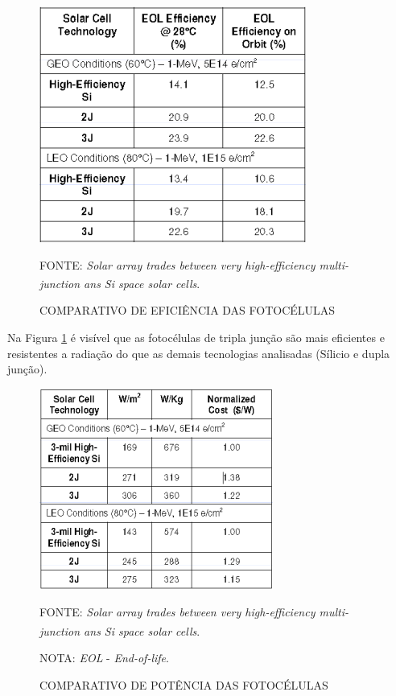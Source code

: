 \documentclass[
	12pt,				%
	openright,			%
	oneside,			%
	a4paper,			%
	english,			%
	french,				%
	spanish,			%
	brazil,				%
	oldfontcommands
	]{abntex2}
\begin{document}
	\begin{figure}[th]
		\caption{COMPARATIVO DE EFICIÊNCIA DAS FOTOCÉLULAS}
		\label{Fig_cell_comp1}
		\centering
		\includegraphics[width=0.6\linewidth]{./figs/cell_comp1}
			
		\begin{small}
			FONTE: \textit{Solar array trades between very high-efficiency multi-junction ans Si space solar cells}.\textsuperscript{\cite{Fatemi}}
		\end{small}
		
		
	\end{figure}
	
	Na Figura \ref{Fig_cell_comp1} é visível que as fotocélulas de tripla junção são mais eficientes e resistentes a radiação do que as demais tecnologias analisadas (Sílicio e dupla junção).
	
	\begin{figure}[th]
		\caption{COMPARATIVO DE POTÊNCIA DAS FOTOCÉLULAS}
		\label{Fig_cell_comp2}
		\centering
		\includegraphics[width=0.6\linewidth]{./figs/cell_comp2}
			
		\begin{small}
			FONTE: \textit{Solar array trades between very high-efficiency multi-junction ans Si space solar cells}.\textsuperscript{\cite{Fatemi}}
		\end{small}
		
		\begin{footnotesize}
		NOTA: \textit{EOL} - \textit{End-of-life}.
	\end{footnotesize}
	\end{figure}	
	
\end{document}
